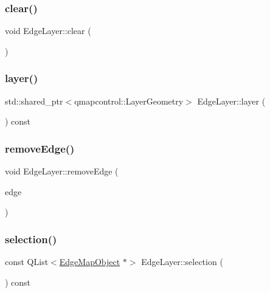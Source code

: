 \subsubsection{\texorpdfstring{clear()}{clear()}}
{\footnotesize\ttfamily void Edge\+Layer\+::clear (\begin{DoxyParamCaption}{ }\end{DoxyParamCaption})}

\mbox{\label{class_edge_layer_a6e02228b0ad8714991aa496d26064a44}} 
\subsubsection{\texorpdfstring{layer()}{layer()}}
{\footnotesize\ttfamily std\+::shared\+\_\+ptr$<$qmapcontrol\+::\+Layer\+Geometry$>$ Edge\+Layer\+::layer (\begin{DoxyParamCaption}{ }\end{DoxyParamCaption}) const\hspace{0.3cm}{\ttfamily [inline]}}

\mbox{\label{class_edge_layer_a1deb9a1fb86ee4a110a1db31b75f9eec}} 
\subsubsection{\texorpdfstring{removeEdge()}{removeEdge()}}
{\footnotesize\ttfamily void Edge\+Layer\+::remove\+Edge (\begin{DoxyParamCaption}\item[{\mbox{\hyperlink{class_edge_map_object}{Edge\+Map\+Object}} $\ast$}]{edge }\end{DoxyParamCaption})}

\mbox{\label{class_edge_layer_a03a5e20611e50c658094e6c75094e857}} 
\subsubsection{\texorpdfstring{selection()}{selection()}}
{\footnotesize\ttfamily const Q\+List$<$\mbox{\hyperlink{class_edge_map_object}{Edge\+Map\+Object}} $\ast$$>$ Edge\+Layer\+::selection (\begin{DoxyParamCaption}{ }\end{DoxyParamCaption}) const\hspace{0.3cm}{\ttfamily [inline]}}

